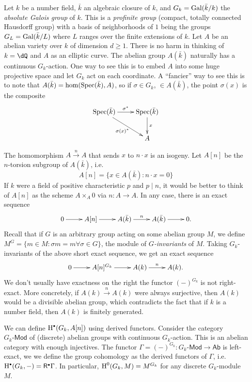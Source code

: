 Let $k$ be a number field, $\bar k$ 
an algebraic closure of $k$, and $G_k=\operatorname{Gal}(\bar k/k)$ the \emph{absolute Galois 
group} of $k$. This is a \emph{profinite group} (compact, totally connected 
Hausdorff group) with a basis of neighborhoods of $1$ being the groups 
$G_L=\operatorname{Gal}(\bar k/L)$ where $L$ ranges over the finite extensions of $k$. Let 
$A$ be an abelian variety over $k$ of dimension $d\geqslant 1$. There is no 
harm in thinking of $k=\dQ$ and $A$ as an elliptic curve. 
The abelian group $A(\bar k)$ naturally has a continuous $G_k$-action. One way 
to see this is to embed $A$ into some huge projective space and let $G_k$ act 
on each coordinate. A ``fancier'' way to see this is to note that 
$A(\bar k) = \hom(\operatorname{Spec}(\bar k),A)$, so if $\sigma\in G_k$, $\in A(\bar k)$, 
the point $\sigma(x)$ is the composite 
\[\xymatrix{
  \spec(\bar k) \ar[r]^-{\sigma^\ast} \ar[dr]_-{\sigma(x)^\ast} 
    & \spec(\bar k) \ar[d]^-x \\
  & A 
}\]

The homomorphism $A\xrightarrow n A$ that sends $x$ to $n\cdot x$ is an 
isogeny. Let $A[n]$ be the $n$-torsion subgroup of $A(\bar k)$, i.e. 
\[
  A[n] = \{x\in A(\bar k) : n\cdot x = 0\}
\]
If $k$ were a field of positive characteristic $p$ and $p\mid n$, it would be 
better to think of $A[n]$ as the scheme $A\times_A 0$ via $n:A\to A$. In any 
case, there is an exact sequence 
\[\xymatrix{
  0 \ar[r] 
    & A[n] \ar[r] 
    & A(\bar k) \ar[r]^-n 
    & A(\bar k) \ar[r] 
    & 0 \text{.}
}\]
Recall that if $G$ is an arbitrary group acting on some abelian group $M$, we 
define $M^G=\{m\in M:\sigma m = m\forall \sigma\in G\}$, the module of 
\emph{$G$-invariants} of $M$. Taking $G_k$-invariants of the above short exact 
sequence, we get an exact sequence 
\[\xymatrix{
  0 \ar[r] 
    & A[n]^{G_k} \ar[r] 
    & A(k) \ar[r]^-n 
    & A(k) \text{.}
}\]
We don't usually have exactness on the right the functor $(-)^{G_k}$ is not 
right-exact. 
More concretely, if $A(k)\xrightarrow n A(k)$ were always surjective, 
then $A(k)$ would be a divisible abelian group, which contradicts the fact that 
if $k$ is a number field, then $A(k)$ is finitely generated. 

We can define $\h^\bullet(G_k,A[n])$ using derived functors. Consider the 
category $G_k\text{-}\mathsf{Mod}$ of (discrete) abelian groups with continuous 
$G_k$-action. This is an abelian category with enough injectives. The functor 
$\Gamma=(-)^{G_k}:G_k\text{-}\mathsf{Mod}\to \mathsf{Ab}$ is left-exact, we we 
define the group cohomology as the derived functors of $\Gamma$, i.e. 
$\h^\bullet(G_k,-) = \mathsf{R}^\bullet \Gamma$. In particular, 
$\operatorname{H}^0(G_k,M) = M^{G_k}$ for any discrete $G_k$-module $M$. 

